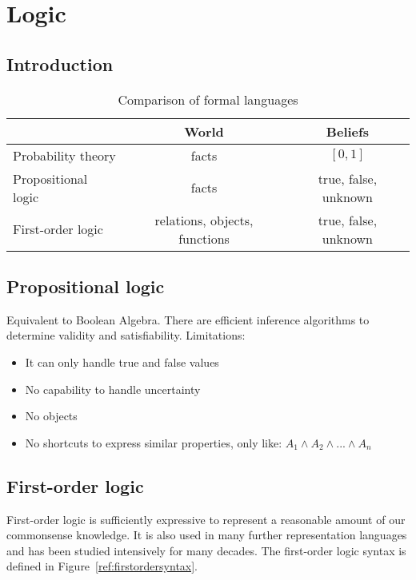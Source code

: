 \documentclass{report}
\begin{document}
\chapter{Logic}
\section{Introduction}

\begin{table}[h!]
\begin{center}
\begin{tabular}{l||c|c}
& World & Beliefs \\
\hline
\hline
Probability theory & facts & $[0,1]$ \\
\hline
Propositional logic & facts & true, false, unknown \\
\hline
First-order logic & relations, objects, functions & true, false, unknown \\
\end{tabular}
\end{center}
\caption{Comparison of formal languages}
\label{ref:complang}
\end{table}


\section{Propositional logic}
Equivalent to Boolean Algebra. There are efficient inference algorithms to determine validity and satisfiability. Limitations:
\begin{itemize}
  \item It can only handle true and false values
  \item No capability to handle uncertainty
  \item No objects
  \item No shortcuts to express similar properties, only like: $A_1 \wedge A_2 \wedge ... \wedge A_n$
\end{itemize}


\section{First-order logic}
First-order logic is sufficiently expressive to represent a reasonable amount of our commonsense knowledge. It is also used in many further representation languages and has been studied intensively for many decades. The first-order logic syntax is defined in Figure~\ref{ref:firstordersyntax}.
\end{document}
